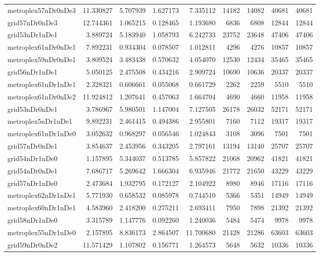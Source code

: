 \begin{longtable}{|l|r|r|r|r|r|r|r|r|}
metroplex57nDr0nDe3 & 11.330827 & 5.707939 & 1.627173 & 7.335112 & 14182 & 14082 & 40681 & 40681 \\
grid57nDr0nDe3 & 12.744361 & 1.065215 & 0.128465 & 1.193680 & 6836 & 6808 & 12844 & 12844 \\
grid53nDr1nDe1 & 3.889724 & 5.183940 & 1.058793 & 6.242733 & 23752 & 23648 & 47406 & 47406 \\
metroplex61nDr0nDe1 & 7.892231 & 0.934304 & 0.078507 & 1.012811 & 4296 & 4276 & 10857 & 10857 \\
metroplex59nDr0nDe1 & 3.809524 & 3.483438 & 0.570632 & 4.054070 & 12530 & 12434 & 35465 & 35465 \\
grid56nDr1nDe1 & 5.050125 & 2.475508 & 0.434216 & 2.909724 & 10690 & 10636 & 20337 & 20337 \\
metroplex61nDr1nDe1 & 2.328321 & 0.606661 & 0.055068 & 0.661729 & 2262 & 2259 & 5510 & 5510 \\
metroplex61nDr0nDe2 & 11.924812 & 1.207641 & 0.457063 & 1.664704 & 4690 & 4660 & 11958 & 11958 \\
grid53nDr0nDe1 & 3.786967 & 5.980501 & 1.147004 & 7.127505 & 26178 & 26032 & 52171 & 52171 \\
metroplex5nDr1nDe1 & 9.892231 & 2.461415 & 0.494386 & 2.955801 & 7160 & 7112 & 19317 & 19317 \\
metroplex61nDr1nDe0 & 3.052632 & 0.968297 & 0.056546 & 1.024843 & 3108 & 3096 & 7501 & 7501 \\
grid57nDr0nDe1 & 3.854637 & 2.453956 & 0.343205 & 2.797161 & 13194 & 13140 & 25707 & 25707 \\
grid54nDr1nDe0 & 1.157895 & 5.344037 & 0.513785 & 5.857822 & 21068 & 20962 & 41821 & 41821 \\
grid54nDr0nDe1 & 7.686717 & 5.269642 & 1.666304 & 6.935946 & 21772 & 21650 & 43229 & 43229 \\
grid57nDr1nDe0 & 2.473684 & 1.932795 & 0.172127 & 2.104922 & 8980 & 8946 & 17116 & 17116 \\
metroplex62nDr1nDe1 & 5.771930 & 0.658532 & 0.085978 & 0.744510 & 5366 & 5351 & 14949 & 14949 \\
metroplex60nDr1nDe1 & 4.583960 & 2.418200 & 0.275211 & 2.693411 & 7950 & 7898 & 21392 & 21392 \\
grid58nDr1nDe0 & 3.315789 & 1.147776 & 0.092260 & 1.240036 & 5484 & 5474 & 9978 & 9978 \\
metroplex55nDr1nDe0 & 2.157895 & 8.836173 & 2.864507 & 11.700680 & 21428 & 21286 & 63603 & 63603 \\
grid59nDr0nDe2 & 11.571429 & 1.107802 & 0.156771 & 1.264573 & 5648 & 5632 & 10336 & 10336 \\

\end{longtable}
